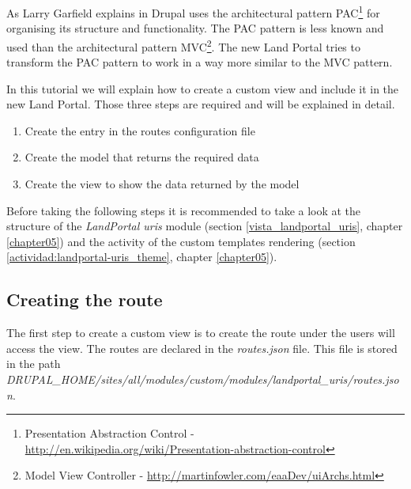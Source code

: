 As Larry Garfield explains in \cite[]{pac-vs-mvc} Drupal uses the architectural pattern PAC\footnote{Presentation Abstraction Control - \url{http://en.wikipedia.org/wiki/Presentation-abstraction-control}} for organising its structure and functionality.  The PAC pattern is less known and used than the architectural pattern MVC\footnote{Model View Controller - \url{http://martinfowler.com/eaaDev/uiArchs.html}}.  The new Land Portal tries to transform the PAC pattern to work in a way more similar to the MVC pattern.

In this tutorial we will explain how to create a custom view and include it in the new Land Portal.  Those three steps are required and will be explained in detail.
\begin{enumerate}
	\item Create the entry in the routes configuration file
	\item Create the model that returns the required data
	\item Create the view to show the data returned by the model
\end{enumerate}

Before taking the following steps it is recommended to take a look at the structure of the \textit{LandPortal uris} module (section \ref{vista_landportal_uris}, chapter \ref{chapter05}) and the activity of the custom templates rendering (section \ref{actividad:landportal-uris_theme}, chapter \ref{chapter05}).

\subsection{Creating the route}
	The first step to create a custom view is to create the route under the users will access the view.  The routes are declared in the \textit{routes.json} file.  This file is stored in the path \textit{DRUPAL\_HOME/sites/all/modules/custom/modules/landportal\_uris/routes.json}.
	
